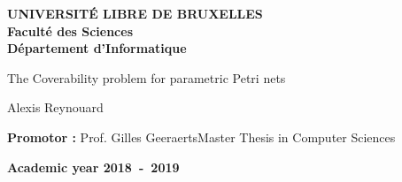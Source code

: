 \documentclass[11pt,a4paper,oneside,draft]{book}
\theoremstyle{plain}
\theoremstyle{definition}
\theoremstyle{remark}
\begin{document}
\frontmatter
\begin{titlepage}
\setcounter{page}{0}
\begin{center}
\textbf{UNIVERSIT\'E LIBRE DE BRUXELLES}\\
\textbf{Faculté des Sciences}\\
\textbf{Département d'Informatique}
\vfill{}\vfill{}

{\Huge  The Coverability problem \vspace*{.5cm}  \linebreak[4] for parametric Petri nets}

{\Huge \par}
\begin{center}{\LARGE Alexis Reynouard}\end{center}{\Huge \par}
\vfill{}\vfill{}
\begin{flushright}{\large \textbf{Promotor :} Prof. Gilles Geeraerts}\hfill{}{\large Master Thesis in Computer Sciences}\\
{\large }\hfill{}{}\end{flushright}{\large\par}
\vfill{}\vfill{}\enlargethispage{3cm}
\textbf{Academic year 2018~-~2019}
\end{center}
\end{titlepage}
\newpage
\thispagestyle{empty}
\null

\newenvironment{vcenterpage}
{\newpage\thispagestyle{empty} 
\vspace*{\fill}}
{\vspace*{\fill}\par\pagebreak}

%
%
%
%
\end{document}
